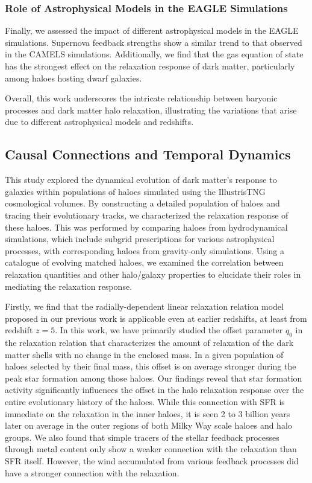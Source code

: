 \subsubsection*{Role of Astrophysical Models in the EAGLE Simulations}
Finally, we assessed the impact of different astrophysical models in the EAGLE simulations. Supernova feedback strengths show a similar trend to that observed in the CAMELS simulations. Additionally, we find that the gas equation of state has the strongest effect on the relaxation response of dark matter, particularly among haloes hosting dwarf galaxies.

Overall, this work underscores the intricate relationship between baryonic processes and dark matter halo relaxation, illustrating the variations that arise due to different astrophysical models and redshifts.

\subsection{Causal Connections and Temporal Dynamics}
This study explored the dynamical evolution of dark matter's response to galaxies within populations of haloes simulated using the IllustrisTNG cosmological volumes. By constructing a detailed population of haloes and tracing their evolutionary tracks, we characterized the relaxation response of these haloes. This was performed by comparing haloes from hydrodynamical simulations, which include subgrid prescriptions for various astrophysical processes, with corresponding haloes from gravity-only simulations. Using a catalogue of evolving matched haloes, we examined the correlation between relaxation quantities and other halo/galaxy properties to elucidate their roles in mediating the relaxation response.

Firstly, we find that the radially-dependent linear relaxation relation model proposed in our previous work is applicable even at earlier redshifts, at least from redshift $z=5$. In this work, we have primarily studied the offset parameter $q_0$ in the relaxation relation that characterizes the amount of relaxation of the dark matter shells with no change in the enclosed mass. In a given population of haloes selected by their final mass, this offset is on average stronger during the peak star formation among those haloes. 
Our findings reveal that star formation activity significantly influences the offset in the halo relaxation response  over the entire evolutionary history of the haloes. While this connection with SFR is immediate on the relaxation in the inner haloes, it is seen 2 to 3 billion years later on average in the outer regions of both Milky Way scale haloes and halo groups. 
We also found that simple tracers of the stellar feedback processes through metal content only show a weaker connection with the relaxation than SFR itself. However, the wind accumulated from various feedback processes did have a stronger connection with the relaxation.

